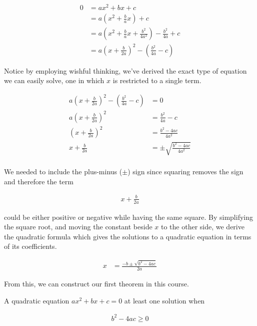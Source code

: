 \documentclass[twoside]{report}
\begin{document}
\begin{align*}
	0 &= ax^2 + bx + c \\
	&= a \left( x^2 + \frac{b}{a}x \right) + c \\
	&= a \left( x^2 + \frac{b}{a}x + \frac{b^2}{4a^2} \right) - \frac{b^2}{4a} + c \\
	&= a \left( x + \frac{b}{2a} \right)^2 - \left(\frac{b^2}{4a} - c \right)
\end{align*}

Notice by employing wishful thinking, we've derived the exact type of equation we can easily solve, one in which $x$ is restricted to a single term.

\begin{align*}
	a \left( x + \frac{b}{2a} \right)^2 - \left( \frac{b^2}{4a} -c \right) &= 0 \\
	a \left( x + \frac{b}{2a} \right)^2 &= \frac{b^2}{4a} - c \\
	\left( x + \frac{b}{2a} \right)^2 &= \frac{b^2 - 4ac}{4a^2} \\
	x + \frac{b}{2a} &= \pm \sqrt{\frac{b^2 - 4ac}{4a^2}} \\
\end{align*}

We needed to include the plus-minus ($\pm$) sign since squaring removes the sign and therefore the term

\begin{align*}
	x + \frac{b}{2a}
\end{align*}

could be either positive or negative while having the same square. By simplifying the square root, and moving the constant beside $x$ to the other side, we derive the quadratic formula which gives the solutions to a quadratic equation in terms of its coefficients.

\begin{align}
	x &= \frac{-b \pm \sqrt{b^2 - 4ac}}{2a}
\end{align}

From this, we can construct our first theorem in this course.

\vspace{\baselineskip}
\begin{theorem}
	A quadratic equation $ax^2 + bx + c = 0$ at least one solution when
	
	\begin{align}
		b^2 - 4ac \ge 0
	\end{align}
\end{theorem}
\end{document}

